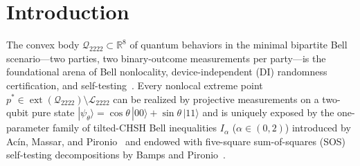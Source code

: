 \documentclass[11pt,a4paper]{article}
\newcommand{\QQ}{\mathbb{Q}}
\newcommand{\RR}{\mathbb{R}}
\newcommand{\calQ}{\mathcal{Q}_{2222}}
\newcommand{\calL}{\mathcal{L}_{2222}}
\newcommand{\calN}{\mathcal{N}_{\mathcal{Q}}}
\newcommand{\calB}{\mathcal{B}}
\newcommand{\ext}{\operatorname{ext}}
\begin{document}
\begin{abstract}
Fourth, we construct an explicit four-vertex rational linear-programming dual certificate proving that the canonical Alice-tilted CHSH functional $I_\alpha$ uniquely minimizes the white-noise visibility threshold $v(\calB) = \beta_{\mathrm{loc}}(\calB)/\beta_Q(\calB) \ge (2+\alpha)/\beta$ across the entire three-dimensional normal cone $\calN(p^*(k))$.
All results are backed by 13 standalone exact-$\QQ$ JSON certificates, four reproducible benchmarks, and a 42-attack adversarial red-team test suite.
\end{abstract}

\section{Introduction}
\label{sec:intro}

The convex body $\calQ \subset \RR^8$ of quantum behaviors in the minimal bipartite Bell scenario---two parties, two binary-outcome measurements per party---is the foundational arena of Bell nonlocality, device-independent (DI) randomness certification, and self-testing~\cite{chsh1969,tsirelson1980quantum,masanes2006asymptotic,acin2012randomness,yang2013robust,goh2018geometry,le2023quantum}.
Every nonlocal extreme point $p^* \in \ext(\calQ) \setminus \calL$ can be realized by projective measurements on a two-qubit pure state $|\psi_\theta\rangle = \cos\theta\,|00\rangle + \sin\theta\,|11\rangle$ and is uniquely exposed by the one-parameter family of tilted-CHSH Bell inequalities $I_\alpha$ ($\alpha \in (0,2)$) introduced by Ac\'in, Massar, and Pironio~\cite{acin2012randomness} and endowed with five-square sum-of-squares (SOS) self-testing decompositions by Bamps and Pironio~\cite{bamps2015sos}.
\end{document}
